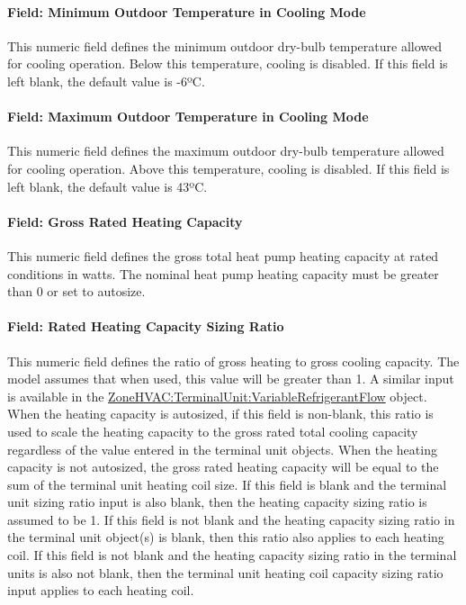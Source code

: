 \paragraph{Field: Minimum Outdoor Temperature in Cooling Mode}\label{field-minimum-outdoor-temperature-in-cooling-mode}

This numeric field defines the minimum outdoor dry-bulb temperature allowed for cooling operation. Below this temperature, cooling is disabled. If this field is left blank, the default value is -6ºC.

\paragraph{Field: Maximum Outdoor Temperature in Cooling Mode}\label{field-maximum-outdoor-temperature-in-cooling-mode}

This numeric field defines the maximum outdoor dry-bulb temperature allowed for cooling operation. Above this temperature, cooling is disabled. If this field is left blank, the default value is 43ºC.

\paragraph{Field: Gross Rated Heating Capacity}\label{field-gross-rated-heating-capacity-000}

This numeric field defines the gross total heat pump heating capacity at rated conditions in watts. The nominal heat pump heating capacity must be greater than 0 or set to autosize.

\paragraph{Field: Rated Heating Capacity Sizing Ratio}\label{field-rated-heating-capacity-sizing-ratio}

This numeric field defines the ratio of gross heating to gross cooling capacity. The model assumes that when used, this value will be greater than 1. A similar input is available in the \hyperref[zonehvacterminalunitvariablerefrigerantflow]{ZoneHVAC:TerminalUnit:VariableRefrigerantFlow} object. When the heating capacity is autosized, if this field is non-blank, this ratio is used to scale the heating capacity to the gross rated total cooling capacity regardless of the value entered in the terminal unit objects. When the heating capacity is not autosized, the gross rated heating capacity will be equal to the sum of the terminal unit heating coil size. If this field is blank and the terminal unit sizing ratio input is also blank, then the heating capacity sizing ratio is assumed to be 1. If this field is not blank and the heating capacity sizing ratio in the terminal unit object(s) is blank, then this ratio also applies to each heating coil. If this field is not blank and the heating capacity sizing ratio in the terminal units is also not blank, then the terminal unit heating coil capacity sizing ratio input applies to each heating coil.

